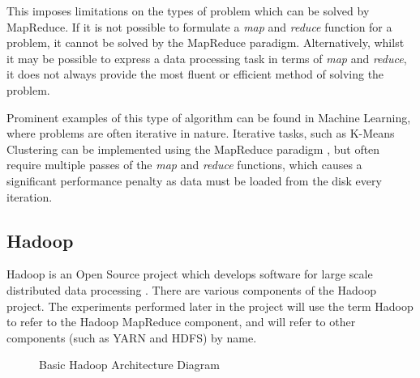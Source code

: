 This imposes limitations on the types of problem which can be solved by MapReduce. If it is not possible to formulate a \textit{map} and \textit{reduce} function for a problem, it cannot be solved by the MapReduce paradigm. Alternatively, whilst it may be possible to express a data processing task in terms of \textit{map} and \textit{reduce}, it does not always provide the most fluent or efficient method of solving the problem. 

Prominent examples of this type of algorithm can be found in Machine Learning, where problems are often iterative in nature. Iterative tasks, such as K-Means Clustering can be implemented using the MapReduce paradigm \cite{zhao2009parallel}, but often require multiple passes of the \textit{map} and \textit{reduce} functions, which causes a significant performance penalty as data must be loaded from the disk every iteration.

\subsection{Hadoop}
Hadoop is an Open Source project which develops software for large scale distributed data processing \cite{hadoop}. There are various components of the Hadoop project. The experiments performed later in the project will use the term Hadoop to refer to the Hadoop MapReduce component, and will refer to other components (such as YARN and HDFS) by name. 

\begin{figure}[H]
\centering
{}
\caption{Basic Hadoop Architecture Diagram}
\end{figure}

